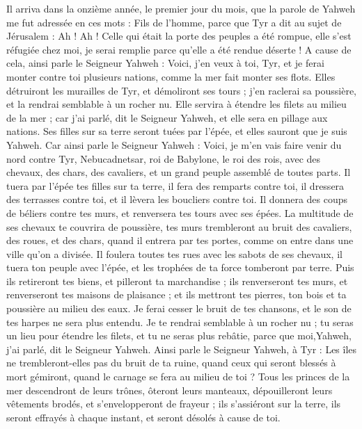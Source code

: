 \begin{multicols}{2}
\VerseOne{}Il arriva dans la onzième année, le premier jour du mois, que la parole de Yahweh me fut adressée en ces mots :
Fils de l'homme, parce que Tyr a dit au sujet de Jérusalem : Ah ! Ah ! Celle qui était la porte des peuples a été rompue, elle s'est réfugiée chez moi, je serai remplie parce qu'elle a été rendue déserte !
A cause de cela, ainsi parle le Seigneur Yahweh : Voici, j'en veux à toi, Tyr, et je ferai monter contre toi plusieurs nations, comme la mer fait monter ses flots.
Elles détruiront les murailles de Tyr, et démoliront ses tours ; j'en raclerai sa poussière, et la rendrai semblable à un rocher nu.
Elle servira à étendre les filets au milieu de la mer ; car j'ai parlé, dit le Seigneur Yahweh, et elle sera en pillage aux nations.
Ses filles sur sa terre seront tuées par l'épée, et elles sauront que je suis Yahweh.
Car ainsi parle le Seigneur Yahweh : Voici, je m'en vais faire venir du nord contre Tyr, Nebucadnetsar, roi de Babylone, le roi des rois, avec des chevaux, des chars, des cavaliers, et un grand peuple assemblé de toutes parts.
Il tuera par l'épée tes filles sur ta terre, il fera des remparts contre toi, il dressera des terrasses contre toi, et il lèvera les boucliers contre toi.
Il donnera des coups de béliers contre tes murs, et renversera tes tours avec ses épées.
La multitude de ses chevaux te couvrira de poussière, tes murs trembleront au bruit des cavaliers, des roues, et des chars, quand il entrera par tes portes, comme on entre dans une ville qu'on a divisée.
Il foulera toutes tes rues avec les sabots de ses chevaux, il tuera ton peuple avec l'épée, et les trophées de ta force tomberont par terre.
Puis ils retireront tes biens, et pilleront ta marchandise ; ils renverseront tes murs, et renverseront tes maisons de plaisance ; et ils mettront tes pierres, ton bois et ta poussière au milieu des eaux.
Je ferai cesser le bruit de tes chansons, et le son de tes harpes ne sera plus entendu.
Je te rendrai semblable à un rocher nu ; tu seras un lieu pour étendre les filets, et tu ne seras plus rebâtie, parce que moi,Yahweh, j'ai parlé, dit le Seigneur Yahweh.
Ainsi parle le Seigneur Yahweh, à Tyr : Les îles ne trembleront-elles pas du bruit de ta ruine, quand ceux qui seront blessés à mort gémiront, quand le carnage se fera au milieu de toi ?
Tous les princes de la mer descendront de leurs trônes, ôteront leurs manteaux, dépouilleront leurs vêtements brodés, et s'envelopperont de frayeur ; ils s'assiéront sur la terre, ils seront effrayés à chaque instant, et seront désolés à cause de toi.

\end{multicols}
